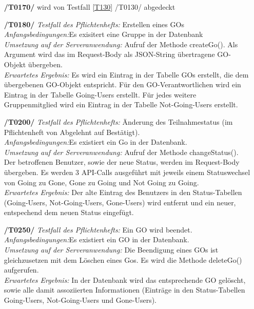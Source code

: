 \documentclass[11pt,a4paper]{scrartcl}
\begin{document}
\begin{enumerate}
	\item[\textbf{/T0170/}] wird von Testfall \ref{T130} /T0130/ abgedeckt
	
	\item[\textbf{/T0180/}]
	\textit{Testfall des Pflichtenhefts: }Erstellen eines GOs\\
	\textit{Anfangsbedingungen:}Es exisitert eine Gruppe in der Datenbank\\
	\textit{Umsetzung auf der Serveranwendung: }Aufruf der Methode createGo(). Als Argument wird das im Request-Body als JSON-String übertragene GO-Objekt übergeben.\\
	\textit{Erwartetes Ergebnis: }Es wird ein Eintrag in der Tabelle GOs erstellt, die dem übergebenen GO-Objekt entspricht. Für den GO-Verantwortlichen wird ein Eintrag in der Tabelle Going-Users erstellt. Für jedes weitere Gruppenmitglied wird ein Eintrag in der Tabelle Not-Going-Users erstellt.
	
	\item[\textbf{/T0200/}]
	\textit{Testfall des Pflichtenhefts: }Änderung des Teilnahmestatus (im Pflichtenheft von Abgelehnt auf Bestätigt).\\
	\textit{Anfangsbedingungen:}Es existiert ein Go in der Datenbank.\\
	\textit{Umsetzung auf der Serveranwendung: }Aufruf der Methode changeStatus(). Der betroffenen Benutzer, sowie der neue Status, werden im Request-Body übergeben. Es werden 3 API-Calls ausgeführt mit jeweils einem Statuswechsel von Going zu Gone, Gone zu Going und Not Going zu Going.\\
	\textit{Erwartetes Ergebnis: }Der alte Eintrag des Benutzers in den Status-Tabellen (Going-Users, Not-Going-Users, Gone-Users) wird entfernt und ein neuer, entspechend dem neuen Status eingefügt.
	
	\item[\textbf{/T0250/}]
	\textit{Testfall des Pflichtenhefts: }Ein GO wird beendet.\\
	\textit{Anfangsbedingungen:}Es existiert ein GO in der Datenbank.\\
	\textit{Umsetzung auf der Serveranwendung: }Die Beendigung eines GOs ist gleichzusetzen mit dem Löschen eines Gos. Es wird die Methode deleteGo() aufgerufen.\\
	\textit{Erwartetes Ergebnis: }In der Datenbank wird das entsprechende GO gelöscht, sowie alle damit assoziierten Informationen (Einträge in den Status-Tabellen Going-Users, Not-Going-Users und Gone-Users).
	

\end{enumerate}
\end{document}
